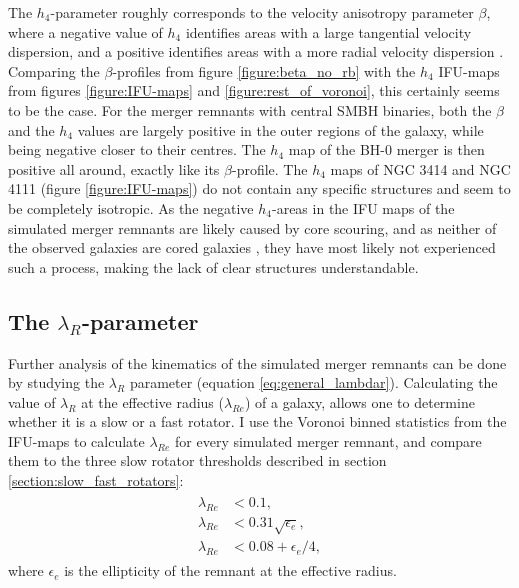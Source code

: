 \documentclass[english, twoside]{HYgradu}
\begin{document}
The $h_4$-parameter roughly corresponds to the velocity anisotropy parameter $\beta$, where a negative value of $h_4$ identifies areas with a large tangential velocity dispersion, and a positive identifies areas with a more radial velocity dispersion \citep{Gerhard1993, Gerhard1998, Thomas2007}. Comparing the $\beta$-profiles from figure \ref{figure:beta_no_rb} with the $h_4$ IFU-maps from figures \ref{figure:IFU-maps} and \ref{figure:rest_of_voronoi}, this certainly seems to be the case. For the merger remnants with central SMBH binaries, both the $\beta$ and the $h_4$ values are largely positive in the outer regions of the galaxy, while being negative closer to their centres. The $h_4$ map of the BH-0 merger is then positive all around, exactly like its $\beta$-profile. The $h_4$ maps of NGC 3414 and NGC 4111 (figure \ref{figure:IFU-maps}) do not contain any specific structures and seem to be completely isotropic. As the negative $h_4$-areas in the IFU maps of the simulated merger remnants are likely caused by core scouring, and as neither of the observed galaxies are cored galaxies \citep{Lauer2007}, they have most likely not experienced such a process, making the lack of clear structures understandable.

\subsection{The $\lambda_R$-parameter}

Further analysis of the kinematics of the simulated merger remnants can be done by studying the $\lambda_R$ parameter (equation \ref{eq:general_lambdar}). Calculating the value of $\lambda_R$ at the effective radius ($\lambda_{Re}$) of a galaxy, allows one to determine whether it is a slow or a fast rotator. I use the Voronoi binned statistics from the IFU-maps to calculate $\lambda_{Re}$ for every simulated merger remnant, and compare them to the three slow rotator thresholds described in section \ref{section:slow_fast_rotators}:
 \begin{align}
\begin{split}
\lambda_{Re} &< 0.1, \\
\lambda_{Re} &< 0.31\sqrt{\epsilon_e},\\
\lambda_{Re} &< 0.08 + \epsilon_e/4,
\end{split}
\end{align}
where $\epsilon_e$ is the ellipticity of the remnant at the effective radius.
\end{document}
